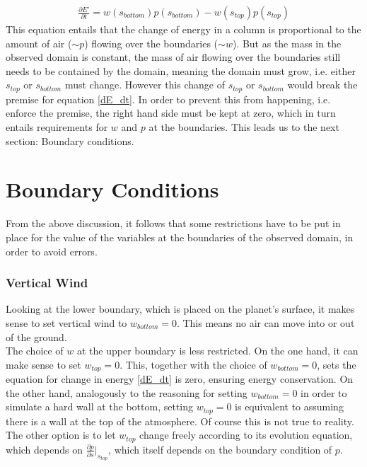 \begin{align}\label{dE_dt}
\frac{\partial E'}{\partial t} = w(s_{bottom})p(s_{bottom})-w(s_{top})p(s_{top})
\end{align}
This equation entails that the change of energy in a column is proportional to the amount of air ($\sim p$) flowing over the boundaries ($\sim w$).
But as the mass in the observed domain is constant, the mass of air flowing over the boundaries still needs to be contained by the domain, meaning the domain must grow, i.e. either $s_{top}$ or $s_{bottom}$ must change.
However this change of $s_{top}$ or $s_{bottom}$ would break the premise for equation \ref{dE_dt}.
In order to prevent this from happening, i.e. enforce the premise, the right hand side must be kept at zero, which in turn entails requirements for $w$ and $p$ at the boundaries.
This leads us to the next section: Boundary conditions.


\section{Boundary Conditions}\label{sec:boundary}
From the above discussion, it follows that some restrictions have to be put in place for the value of the variables at the boundaries of the observed domain, in order to avoid errors.
\subsubsection{Vertical Wind}
Looking at the lower boundary, which is placed on the planet's surface, it makes sense to set vertical wind to $w_{bottom}=0$.
This means no air can move into or out of the ground.\\
The choice of $w$ at the upper boundary is less restricted.
On the one hand, it can make sense to set $w_{top}=0$.
This, together with the choice of $w_{bottom}=0$, sets the equation for change in energy \ref{dE_dt} is zero, ensuring energy conservation.
On the other hand, analogously to the reasoning for setting $w_{bottom}=0$ in order to simulate a hard wall at the bottom, setting $w_{top}=0$ is equivalent to assuming there is a wall at the top of the atmosphere.
Of course this is not true to reality.\\
The other option is to let $w_{top}$ change freely according to its evolution equation, which depends on $\frac{\partial p}{\partial s}\rvert _{s_{top}}$, which itself depends on the boundary condition of $p$.
